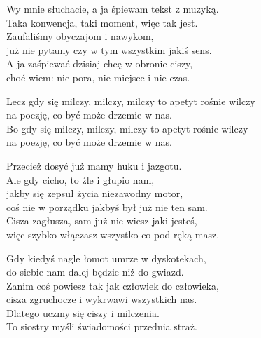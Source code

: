 \begin{text}
\small{
        \chordfill
    Wy mnie słuchacie, a ja śpiewam tekst z muzyką.\\
    Taka konwencja, taki moment, więc tak jest.\\
    Zaufaliśmy obyczajom i nawykom,\\
    już nie pytamy czy w tym wszystkim jakiś sens.\\
    A ja zaśpiewać dzisiaj chcę w obronie ciszy,\\
    choć wiem: nie pora, nie miejsce i nie czas.

    Lecz gdy się milczy, milczy, milczy to apetyt rośnie wilczy\\
    na poezję, co być może drzemie w nas.\\
    Bo gdy się milczy, milczy, milczy to apetyt rośnie wilczy\\
    na poezję, co być może drzemie w nas.

    Przecież dosyć już mamy huku i jazgotu.\\
    Ale gdy cicho, to źle i głupio nam,\\
    jakby się zepsuł życia niezawodny motor,\\
    coś nie w porządku jakbyś był już nie ten sam.\\
    Cisza zagłusza, sam już nie wiesz jaki jesteś,\\
    więc szybko włączasz wszystko co pod ręką masz.

    Gdy kiedyś nagle łomot umrze w dyskotekach,\\
    do siebie nam dalej będzie niż do gwiazd.\\
    Zanim coś powiesz tak jak człowiek do człowieka,\\
    cisza zgruchocze i wykrwawi wszystkich nas.\\
    Dlatego uczmy się ciszy i milczenia.\\
    To siostry myśli świadomości przednia straż.
}
\end{text}
